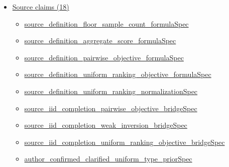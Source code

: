 \documentclass[10pt]{article}
\begin{document}
\begin{itemize}[leftmargin=1.2em]
\begin{itemize}[leftmargin=1.2em]
\item \hyperlink{library-prerequisite-37e76ec4b43ab68b}{EconCSLib.Probability.finiteUniformFloorPkObjective}
\item \hyperlink{library-prerequisite-cab4ce12b83ad98a}{EconCSLib.Probability.pairwiseSellerThresholdRateTop}
\item \hyperlink{library-prerequisite-d2e451dbad72942b}{EconCSLib.Probability.ratingLogMGF}
\item \hyperlink{library-prerequisite-96ef8942e7110091}{EconCSLib.Probability.ratingRateFunction}
\item \hyperlink{library-prerequisite-c18b92519b0314cc}{EconCSLib.Probability.ratingRateFunctionTop}
\item \hyperlink{library-prerequisite-2b1c527f6cbee7fb}{EconCSLib.Probability.twoSampleScoreGapLeftTailProb}
\item \hyperlink{library-prerequisite-c2c25007b5e7f247}{EconCSLib.Probability.twoSampleFloorScoreGapLeftTailProb}
\item \hyperlink{library-prerequisite-00a2add8d3a6edfc}{EconCSLib.uniformPMF}
\end{itemize}
\item \hyperlink{source-section-f10b5f68e4acf3dc}{Source claims (18)}
\begin{itemize}[leftmargin=1.2em]
\item \hyperlink{source-claim-08e48b913029b561}{source\_definition\_floor\_sample\_count\_formulaSpec}
\item \hyperlink{source-claim-038938d2e8c6aaa5}{source\_definition\_aggregate\_score\_formulaSpec}
\item \hyperlink{source-claim-eb16a2642f471c57}{source\_definition\_pairwise\_objective\_formulaSpec}
\item \hyperlink{source-claim-bfe70859810ece12}{source\_definition\_uniform\_ranking\_objective\_formulaSpec}
\item \hyperlink{source-claim-62699e0d2b178e68}{source\_definition\_uniform\_ranking\_normalizationSpec}
\item \hyperlink{source-claim-803ea24378437fda}{source\_iid\_completion\_pairwise\_objective\_bridgeSpec}
\item \hyperlink{source-claim-28e9ead3a5c0a6ce}{source\_iid\_completion\_weak\_inversion\_bridgeSpec}
\item \hyperlink{source-claim-75935d7eb4e2aa12}{source\_iid\_completion\_uniform\_ranking\_objective\_bridgeSpec}
\item \hyperlink{source-claim-1f3b4948b5efbf34}{author\_confirmed\_clarified\_uniform\_type\_priorSpec}

\end{itemize}
\end{itemize}
\end{document}
